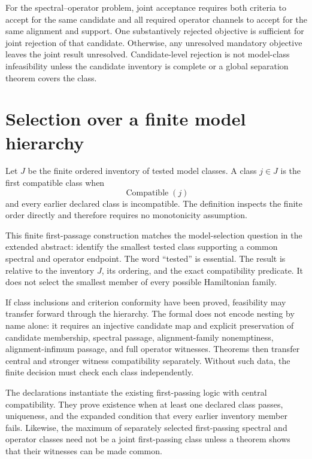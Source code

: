 For the spectral--operator problem, joint acceptance requires both criteria to accept
for the same candidate and all required operator channels to accept for the same
alignment and support.  One substantively rejected objective is sufficient for joint
rejection of that candidate.  Otherwise, any unresolved mandatory objective leaves the
joint result unresolved.  Candidate-level rejection is not model-class infeasibility
unless the candidate inventory is complete or a global separation theorem covers the
class.

\section{Selection over a finite model hierarchy}

Let $J$ be the finite ordered inventory of tested model classes.  A class $j\in J$ is
the first compatible class when
\[
  \operatorname{Compatible}(j)
\]
and every earlier declared class is incompatible.  The definition inspects the finite
order directly and therefore requires no monotonicity assumption.

This finite first-passage construction matches the model-selection question in the
extended abstract: identify the smallest tested class supporting a common spectral and
operator endpoint.  The word ``tested'' is essential.  The result is relative to the
inventory $J$, its ordering, and the exact compatibility predicate.  It does not select
the smallest member of every possible Hamiltonian family.

If class inclusions and criterion conformity have been proved, feasibility may transfer
forward through the hierarchy.  The formal
 does not encode nesting by name alone: it requires an
injective candidate map and explicit preservation of candidate membership, spectral
passage, alignment-family nonemptiness, alignment-infimum passage, and full operator
witnesses.  Theorems  then transfer central and stronger
witness compatibility separately.  Without such data, the finite decision must check
each class independently.

The declarations  instantiate the existing first-passing
logic with central compatibility.  They prove existence when at least one declared class
passes, uniqueness, and the expanded condition that every earlier inventory member
fails.  Likewise, the maximum of separately selected first-passing spectral and
operator classes need not be a joint first-passing class unless a theorem shows that
their witnesses can be made common.


